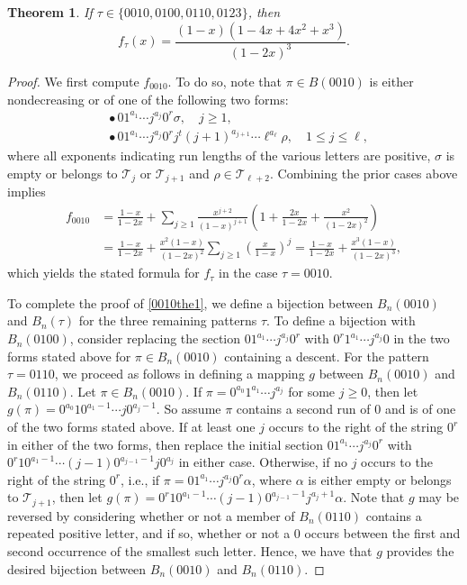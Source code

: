 \documentclass{article}
\theoremstyle{remark}
\theoremstyle{plain}
\newtheorem{theorem}{Theorem}[section]
\begin{document}
\begin{theorem}\label{0010th}
If $\tau \in \{0010,0100,0110,0123\}$, then
\begin{equation}\label{0010the1}
f_\tau(x)=\frac{(1-x)(1-4x+4x^2+x^3)}{(1-2x)^3}.
\end{equation}
\end{theorem}
\begin{proof}
We first compute $f_{0010}$.  To do so, note that $\pi \in B(0010)$ is either nondecreasing or of one of the following two forms:
\begin{align*}
&\bullet\,01^{a_1}\cdots j^{a_j}0^r\sigma, \quad j \geq 1,\\
&\bullet\,01^{a_1}\cdots j^{a_j}0^rj^t(j+1)^{a_{j+1}}\cdots\ell^{a_\ell}\rho, \quad 1 \leq j \leq \ell,
\end{align*}
where all exponents indicating run lengths of the various letters are positive, $\sigma$ is empty or belongs to $\mathcal{T}_j$ or $\mathcal{T}_{j+1}$ and $\rho \in \mathcal{T}_{\ell+2}$.  Combining the prior cases above implies
\begin{align*}
f_{0010}&=\frac{1-x}{1-2x}+\sum_{j\geq1}\frac{x^{j+2}}{(1-x)^{j+1}}\left(1+\frac{2x}{1-2x}+\frac{x^2}{(1-2x)^2}\right)\\
&=\frac{1-x}{1-2x}+\frac{x^2(1-x)}{(1-2x)^2}\sum_{j\geq1}\left(\frac{x}{1-x}\right)^j=\frac{1-x}{1-2x}+\frac{x^3(1-x)}{(1-2x)^3},
\end{align*}
which yields the stated formula for $f_\tau$ in the case $\tau=0010$.

To complete the proof of \eqref{0010the1}, we define a bijection between $B_n(0010)$ and $B_n(\tau)$ for the three remaining patterns $\tau$.  To define a bijection with $B_n(0100)$, consider replacing the section $01^{a_1}\cdots j^{a_j}0^r$ with $0^r1^{a_1}\cdots j^{a_j}0$ in the two forms stated above for $\pi \in B_n(0010)$ containing a descent. For the pattern $\tau=0110$, we proceed as follows in defining a mapping $g$ between $B_n(0010)$ and $B_n(0110)$.  Let $\pi \in B_n(0010)$.  If $\pi=0^{a_0}1^{a_1}\cdots j^{a_j}$ for some $j \geq0$, then let $g(\pi)=0^{a_0}10^{a_1-1}\cdots j0^{a_{j}-1}$.  So assume $\pi$ contains a second run of 0 and is of one of the two forms stated above.  If at least one $j$ occurs to the right of the string $0^r$ in either of the two forms, then replace the initial section $01^{a_1}\cdots j^{a_j}0^r$ with $0^r10^{a_1-1}\cdots(j-1)0^{a_{j-1}-1}j0^{a_j}$ in either case.  Otherwise, if no $j$ occurs to the right of the string $0^r$, i.e., if $\pi=01^{a_1}\cdots j^{a_j}0^r\alpha$, where $\alpha$ is either empty or belongs to $\mathcal{T}_{j+1}$, then let $g(\pi)=0^r10^{a_1-1}\cdots(j-1)0^{a_{j-1}-1}j^{a_j+1}\alpha$.  Note that $g$ may be reversed by considering whether or not a member of $B_n(0110)$ contains a repeated positive letter, and if so, whether or not a 0 occurs between the first and second occurrence of the smallest such letter. Hence, we have that $g$ provides the desired bijection between $B_n(0010)$ and $B_n(0110)$.


\end{proof}
\end{document}
